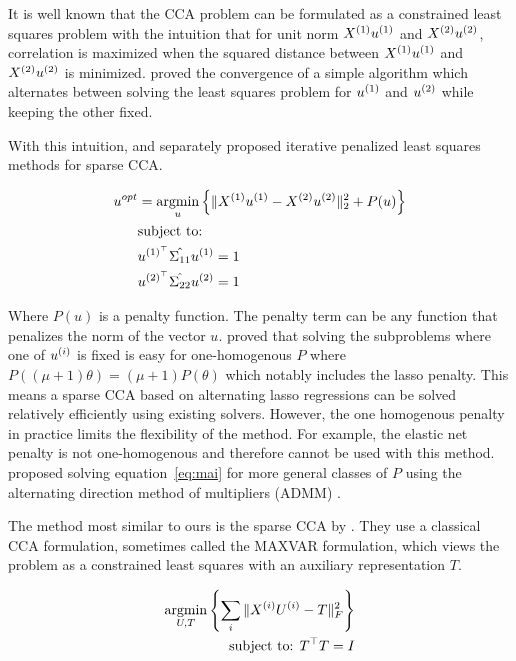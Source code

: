 It is well known that the CCA problem can be formulated as a constrained least squares problem with the intuition that
for unit norm \(X^{(1)} u^{(1)}\) and \(X^{(2)} u^{(2)}\), correlation is maximized when the squared distance
between \(X^{(1)} u^{(1)}\) and \(X^{(2)} u^{(2)}\) is minimized. \citep{golub1995canonical} proved the
convergence of a simple algorithm which alternates between solving the least squares problem for \(u^{(1)}\) and
\(u^{(2)}\) while keeping the other fixed.

With this intuition, \citep{wilms2015sparse} and \citep{mai2019iterative} separately proposed iterative penalized least
squares methods for sparse CCA.

\begin{align}
    \label{eq:mai}
    u^{opt} &= \underset{u}{\mathrm{argmin}} \left\{ \|X^{(1)}u^{(1)} - X^{(2)}u^{(2)}\|_2^2 + P(u) \right\} \\
    &\text{subject to:} \notag \\
    &u^{(1)^{\top}} \hat{\Sigma_{11}} u^{(1)}=1 \notag \\
    &u^{(2)^{\top}} \hat{\Sigma_{22}} u^{(2)}=1 \notag
\end{align}

Where \(P(u)\) is a penalty function.
The penalty term can be any function that penalizes the norm of the vector \(u\).
\citep{mai2019iterative} proved that solving the subproblems where one of $u^{(i)}$ is fixed is easy for one-homogenous $P$ where
\( P((\mu + 1)\theta) = (\mu + 1)P(\theta) \) which notably includes the lasso penalty.
This means a sparse CCA based
on alternating lasso regressions can be solved relatively efficiently using existing solvers.
However, the one homogenous penalty in practice limits the flexibility of the method.
For example, the elastic net penalty is not one-homogenous and therefore cannot be used with this method.\citep{
    kanatsoulis2018structured} proposed solving equation~\ref{eq:mai} for more general classes of $P$ using the
alternating direction method of multipliers (ADMM) \citep{boyd2011distributed}.

The method most similar to ours is the sparse CCA by \citep{fu2017scalable}.
They use a classical CCA formulation, sometimes called the MAXVAR formulation, which views the problem as a constrained least squares with an auxiliary representation $T$\citep{carroll1968generalization,kettenring1971canonical}.


\begin{align}\label{eq:fu}
    \underset{U, T}{\mathrm{argmin}}\left\{\sum_i \|X^{(i)} U^{(i)} - T\|_F^2\right\}\\
    \text{subject to: }T^\top T = I\\
\end{align}

